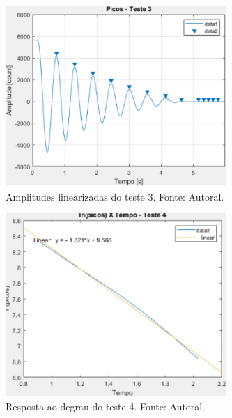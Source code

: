 \documentclass{ifacconf}
\begin{document}
\begin{figure}[!htb]
  \begin{center}
  \includegraphics[width=8.4cm]{figures/picos_teste_3.png}    %
  \caption{Amplitudes linearizadas do teste 3. Fonte: Autoral.} 
  \label{fig:regressao_teste_3}
  \end{center}
\end{figure}

\begin{figure}[!htb]
  \begin{center}
  \includegraphics[width=8.4cm]{figures/regressao_teste_4.png}    %
  \caption{Resposta ao degrau do teste 4. Fonte: Autoral.} 
  \label{fig:picos_teste_4}
  \end{center}
\end{figure}
\end{document}
